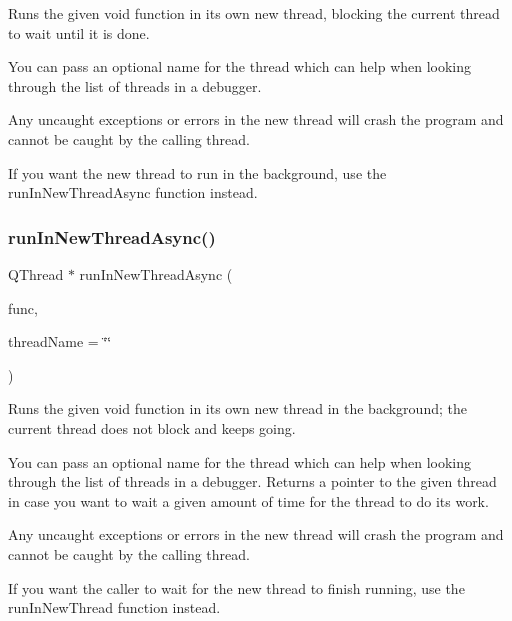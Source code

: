 Runs the given void function in its own new thread, blocking the current thread to wait until it is done. 

You can pass an optional name for the thread which can help when looking through the list of threads in a debugger.

Any uncaught exceptions or errors in the new thread will crash the program and cannot be caught by the calling thread.

If you want the new thread to run in the background, use the {\ttfamily run\+In\+New\+Thread\+Async} function instead. \mbox{\label{classGThread_ad677139bc51c13b4dd55f0c15c7d9624}} 
\subsubsection{\texorpdfstring{run\+In\+New\+Thread\+Async()}{runInNewThreadAsync()}}
{\footnotesize\ttfamily Q\+Thread $\ast$ run\+In\+New\+Thread\+Async (\begin{DoxyParamCaption}\item[{G\+Thunk}]{func,  }\item[{const std\+::string \&}]{thread\+Name = {\ttfamily \char`\"{}\char`\"{}} }\end{DoxyParamCaption})\hspace{0.3cm}{\ttfamily [static]}}



Runs the given void function in its own new thread in the background; the current thread does not block and keeps going. 

You can pass an optional name for the thread which can help when looking through the list of threads in a debugger. Returns a pointer to the given thread in case you want to wait a given amount of time for the thread to do its work.

Any uncaught exceptions or errors in the new thread will crash the program and cannot be caught by the calling thread.

If you want the caller to wait for the new thread to finish running, use the {\ttfamily run\+In\+New\+Thread} function instead. \mbox{\label{classGThread_a33da0c87717269710ac7a564a1ebbe64}} 
